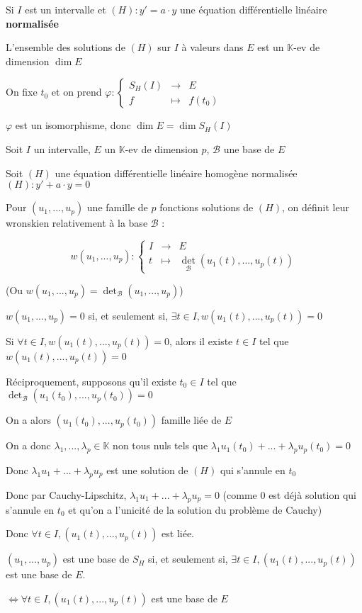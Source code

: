\documentclass[a4paper,12pt]{book}
\newcommand{\Def}[2]{\begin{tcolorbox}[sharp corners, colback=white,colframe=blue!90!black!75, title=Définition : #1]#2\end{tcolorbox}}
\newcommand{\Prop}[2]{\begin{tcolorbox}[sharp corners, colback=white,colframe=red!90!black!75, title=Proposition : #1]#2\end{tcolorbox}}
\newcommand{\Pre}[1]{\begin{tcolorbox}[sharp corners, colback=white,colframe=green!60!green!30!black!75, title=Preuve]#1\end{tcolorbox}}
\def\K{\mathbb{K}}
\begin{document}
\Prop{Corollaire}{Si $I$ est un intervalle et $(H) : y' = a\cdot y$ une équation différentielle linéaire \textbf{normalisée}
\par L'ensemble des solutions de $(H)$ sur $I$ à valeurs dans $E$ est un $\K$-ev de dimension $\dim E$}
\Pre{On fixe $t_0$ et on prend $\varphi:\left\{\begin{array}{rcl} S_H(I) & \to & E \\ f & \mapsto & f(t_0)\end{array}\right.$
\par $\varphi$ est un isomorphisme, donc $\dim E = \dim S_H(I)$}
\Def{Wronskien}{Soit $I$ un intervalle, $E$ un $\K$-ev de dimension $p$, $\mathcal{B}$ une base de $E$
\par Soit $(H)$ une équation différentielle linéaire homogène normalisée $(H) : y' + a\cdot y=0$
\par Pour $(u_1,..., u_p)$ une famille de $p$ fonctions solutions de $(H)$, on définit leur wronskien relativement à la base $\mathcal{B}$ :
\par $$w(u_1,..., u_p) :\left\{\begin{array}{rcl}I & \to & E \\ t & \mapsto & \det_\mathcal{B}(u_1(t),..., u_p(t))\end{array}\right.$$
\par (Ou $w(u_1,...,u_p) = \det_\mathcal{B}(u_1,..., u_p)$)}
\Prop{}{$w(u_1,..., u_p)=0$ si, et seulement si, $\exists t\in I, w(u_1(t),...,u_p(t))=0$}
\Pre{Si $\forall t\in I, w(u_1(t),..., u_p(t)) = 0$, alors il existe $t\in I$ tel que $w(u_1(t),..., u_p(t))=0$
\par Réciproquement, supposons qu'il existe $t_0\in I$ tel que $\det_\mathcal{B}(u_1(t_0),...,u_p(t_0)) =0$
\par On a alors $(u_1(t_0),...,u_p(t_0))$ famille liée de $E$
\par On a donc $\lambda_1,..., \lambda_p\in\K$ non tous nuls tels que $\lambda_1u_1(t_0) +...+\lambda_pu_p(t_0)=0$
\par Donc $\lambda_1u_1+...+\lambda_pu_p$ est une solution de $(H)$ qui s'annule en $t_0$
\par Donc par Cauchy-Lipschitz, $\lambda_1u_1+...+\lambda_pu_p=0$ (comme $0$ est déjà solution qui s'annule en $t_0$ et qu'on a l'unicité de la solution du problème de Cauchy)
\par Donc $\forall t\in I, (u_1(t),..., u_p(t))$ est liée.}
\Prop{Autre formulation}{$(u_1,...,u_p)$ est une base de $S_H$ si, et seulement si, $\exists t\in I, (u_1(t),...,u_p(t))$ est une base de $E$.
\par $\Leftrightarrow \forall t\in I, (u_1(t),...,u_p(t))$ est une base de $E$}
\end{document}
